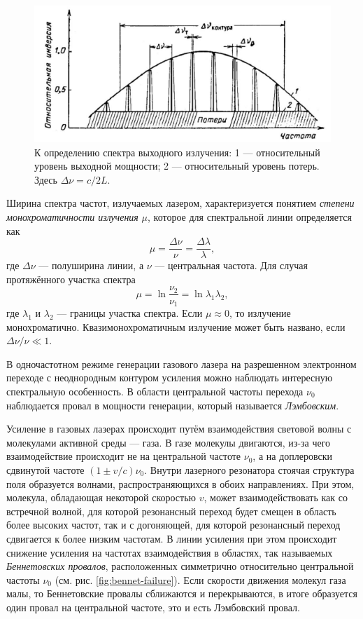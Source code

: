 \documentclass[12pt, russian, a4paper]{article}
\begin{document}
	\begin{figure}[htbp]
		\centering
		\includegraphics[scale=0.8]{freq-width.png}
		\caption{К определению спектра выходного излучения: 1 --- относительный уровень выходной мощности; 2 --- относительный уровень потерь. Здесь $\Delta\nu = c/2L$.}
		\label{fig:freq-width}
	\end{figure}

	Ширина спектра частот, излучаемых лазером, характеризуется понятием \emph{степени монохроматичности излучения} $\mu$, которое для спектральной линии определяется как 
	\begin{equation}
		\mu = \dfrac{\Delta\nu}{\nu} = \dfrac{\Delta\lambda}{\lambda},
	\end{equation}
	где $\Delta\nu$ --- полуширина линии, а $\nu$ --- центральная частота. Для случая протяжённого участка спектра 
	\begin{equation}
		\mu = \ln\dfrac{\nu_2}{\nu_1} = \ln{\lambda_1}{\lambda_2},
	\end{equation}
	где $\lambda_1$ и $\lambda_2$ --- границы участка спектра. Если $\mu\approx0$, то излучение монохроматично. Квазимонохроматичным излучение может быть названо, если ${\Delta\nu}/{\nu}\ll1$.


	В одночастотном режиме генерации газового лазера на разрешенном электронном переходе с неоднородным контуром усиления можно наблюдать интересную спектральную особенность. В области центральной частоты перехода $\nu_0$ наблюдается провал в мощности генерации, который называется \emph{Лэмбовским}. 

	Усиление в газовых лазерах происходит путём взаимодействия световой волны с молекулами активной среды --- газа. В газе молекулы двигаются, из-за чего взаимодействие происходит не на центральной частоте $\nu_0$, а на доплеровски сдвинутой частоте $(1\pm v/c)\nu_0$. Внутри лазерного резонатора стоячая структура поля образуется волнами, распространяющихся в обоих направлениях. При этом, молекула, обладающая некоторой скоростью $v$, может взаимодействовать как со встречной волной, для которой резонансный переход будет смещен в область более высоких частот, так и с догоняющей, для которой резонансный переход сдвигается к более низким частотам. В линии усиления при этом происходит снижение усиления на частотах взаимодействия в областях, так называемых \emph{Беннетовских провалов}, расположенных симметрично относительно центральной частоты $\nu_0$ (см. рис. \ref{fig:bennet-failure}). Если скорости движения молекул газа малы, то Беннетовские провалы сближаются и перекрываются, в итоге образуется один провал на центральной частоте, это и есть Лэмбовский провал.
\end{document}
